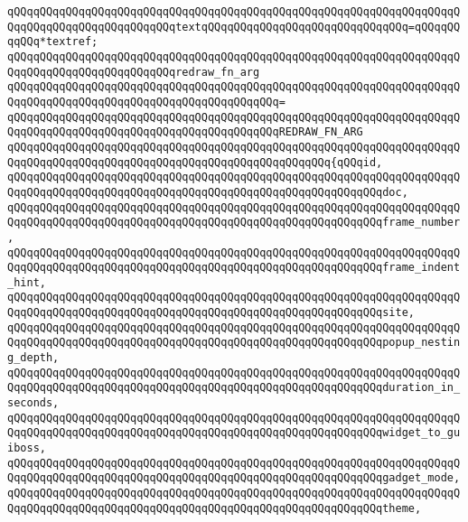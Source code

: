 \newline
\verb|qQQqqQQqqQQqqQQqqQQqqQQqqQQqqQQqqQQqqQQqqQQqqQQqqQQqqQQqqQQqqQQqqQQqqQQqqQQqqQQqqQQqqQQqqQQqqQQqtextqQQqqQQqqQQqqQQqqQQqqQQqqQQqqQQq=qQQqqQQqqQQq*textref;|\newline
\newline
\verb|qQQqqQQqqQQqqQQqqQQqqQQqqQQqqQQqqQQqqQQqqQQqqQQqqQQqqQQqqQQqqQQqqQQqqQQqqQQqqQQqqQQqqQQqqQQqqQQqredraw_fn_arg|\newline
\verb|qQQqqQQqqQQqqQQqqQQqqQQqqQQqqQQqqQQqqQQqqQQqqQQqqQQqqQQqqQQqqQQqqQQqqQQqqQQqqQQqqQQqqQQqqQQqqQQqqQQqqQQqqQQqqQQq=|\newline
\verb|qQQqqQQqqQQqqQQqqQQqqQQqqQQqqQQqqQQqqQQqqQQqqQQqqQQqqQQqqQQqqQQqqQQqqQQqqQQqqQQqqQQqqQQqqQQqqQQqqQQqqQQqqQQqqQQqREDRAW_FN_ARG|\newline
\verb|qQQqqQQqqQQqqQQqqQQqqQQqqQQqqQQqqQQqqQQqqQQqqQQqqQQqqQQqqQQqqQQqqQQqqQQqqQQqqQQqqQQqqQQqqQQqqQQqqQQqqQQqqQQqqQQqqQQqqQQq{qQQqid,|\newline
\verb|qQQqqQQqqQQqqQQqqQQqqQQqqQQqqQQqqQQqqQQqqQQqqQQqqQQqqQQqqQQqqQQqqQQqqQQqqQQqqQQqqQQqqQQqqQQqqQQqqQQqqQQqqQQqqQQqqQQqqQQqqQQqqQQqdoc,|\newline
\verb|qQQqqQQqqQQqqQQqqQQqqQQqqQQqqQQqqQQqqQQqqQQqqQQqqQQqqQQqqQQqqQQqqQQqqQQqqQQqqQQqqQQqqQQqqQQqqQQqqQQqqQQqqQQqqQQqqQQqqQQqqQQqqQQqframe_number,|\newline
\verb|qQQqqQQqqQQqqQQqqQQqqQQqqQQqqQQqqQQqqQQqqQQqqQQqqQQqqQQqqQQqqQQqqQQqqQQqqQQqqQQqqQQqqQQqqQQqqQQqqQQqqQQqqQQqqQQqqQQqqQQqqQQqqQQqframe_indent_hint,|\newline
\verb|qQQqqQQqqQQqqQQqqQQqqQQqqQQqqQQqqQQqqQQqqQQqqQQqqQQqqQQqqQQqqQQqqQQqqQQqqQQqqQQqqQQqqQQqqQQqqQQqqQQqqQQqqQQqqQQqqQQqqQQqqQQqqQQqsite,|\newline
\verb|qQQqqQQqqQQqqQQqqQQqqQQqqQQqqQQqqQQqqQQqqQQqqQQqqQQqqQQqqQQqqQQqqQQqqQQqqQQqqQQqqQQqqQQqqQQqqQQqqQQqqQQqqQQqqQQqqQQqqQQqqQQqqQQqpopup_nesting_depth,|\newline
\verb|qQQqqQQqqQQqqQQqqQQqqQQqqQQqqQQqqQQqqQQqqQQqqQQqqQQqqQQqqQQqqQQqqQQqqQQqqQQqqQQqqQQqqQQqqQQqqQQqqQQqqQQqqQQqqQQqqQQqqQQqqQQqqQQqduration_in_seconds,|\newline
\verb|qQQqqQQqqQQqqQQqqQQqqQQqqQQqqQQqqQQqqQQqqQQqqQQqqQQqqQQqqQQqqQQqqQQqqQQqqQQqqQQqqQQqqQQqqQQqqQQqqQQqqQQqqQQqqQQqqQQqqQQqqQQqqQQqwidget_to_guiboss,|\newline
\verb|qQQqqQQqqQQqqQQqqQQqqQQqqQQqqQQqqQQqqQQqqQQqqQQqqQQqqQQqqQQqqQQqqQQqqQQqqQQqqQQqqQQqqQQqqQQqqQQqqQQqqQQqqQQqqQQqqQQqqQQqqQQqqQQqgadget_mode,|\newline
\verb|qQQqqQQqqQQqqQQqqQQqqQQqqQQqqQQqqQQqqQQqqQQqqQQqqQQqqQQqqQQqqQQqqQQqqQQqqQQqqQQqqQQqqQQqqQQqqQQqqQQqqQQqqQQqqQQqqQQqqQQqqQQqqQQqtheme,|\newline

